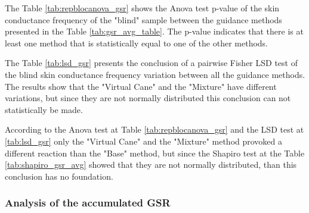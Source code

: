 The Table \ref{tab:repblocanova_gsr} shows the Anova test p-value of the skin conductance frequency of the "blind" sample between the guidance methods presented in the Table \ref{tab:gsr_avg_table}. The p-value indicates that there is at least one method that is statistically equal to one of the other methods.



The Table \ref{tab:lsd_gsr} presents the conclusion of a pairwise Fisher LSD test of the blind skin conductance frequency variation between all the guidance methods. The results show that the "Virtual Cane" and the "Mixture" have different variations, but since they are not normally distributed this conclusion can not statistically be made.



According to the Anova test at Table \ref{tab:repblocanova_gsr} and the LSD test at \ref{tab:lsd_gsr} only the "Virtual Cane" and the "Mixture" method provoked a different reaction than the "Base" method, but since the Shapiro test at the Table \ref{tab:shapiro_gsr_avg} showed that they are not normally distributed, than this conclusion has no foundation.

\subsubsection{Analysis of the accumulated GSR}






